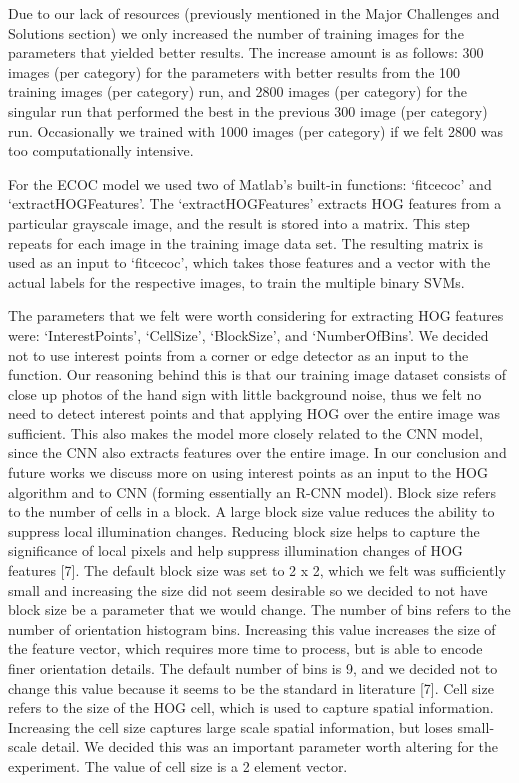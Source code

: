 \documentclass[conference]{IEEEtran}
\begin{document}
Due to our lack of resources (previously mentioned in the Major Challenges and Solutions section) we only increased the number of training images for the parameters that yielded better results. The increase amount is as follows: 300 images (per category) for the parameters with better results from the 100 training images (per category) run, and 2800 images (per category) for the singular run that performed the best in the previous 300 image (per category) run. Occasionally we trained with 1000 images (per category) if we felt 2800 was too computationally intensive.

For the ECOC model we used two of Matlab’s built-in functions: ‘fitcecoc’ and ‘extractHOGFeatures’. The ‘extractHOGFeatures’ extracts HOG features from a particular grayscale image, and the result is stored into a matrix. This step repeats for each image in the training image data set. The resulting matrix is used as an input to ‘fitcecoc’, which takes those features and a vector with the actual labels for the respective images, to train the multiple binary SVMs.

The parameters that we felt were worth considering for extracting HOG features were: ‘InterestPoints’, ‘CellSize’, ‘BlockSize’, and ‘NumberOfBins’. We decided not to use interest points from a corner or edge detector as an input to the function. Our reasoning behind this is that our training image dataset consists of close up photos of the hand sign with little background noise, thus we felt no need to detect interest points and that applying HOG over the entire image was sufficient. This also makes the model more closely related to the CNN model, since the CNN also extracts features over the entire image. In our conclusion and future works we discuss more on using interest points as an input to the HOG algorithm and to CNN (forming essentially an R-CNN model). Block size refers to the number of cells in a block. A large block size value reduces the ability to suppress local illumination changes. Reducing block size helps to capture the significance of local pixels and help suppress illumination changes of HOG features [7]. The default block size was set to 2 x 2, which we felt was sufficiently small and increasing the size did not seem desirable so we decided to not have block size be a parameter that we would change. The number of bins refers to the number of orientation histogram bins. Increasing this value increases the size of the feature vector, which requires more time to process, but is able to encode finer orientation details. The default number of bins is 9, and we decided not to change this value because it seems to be the standard in literature [7]. Cell size refers to the size of the HOG cell, which is used to capture spatial information. Increasing the cell size captures large scale spatial information, but loses small-scale detail. We decided this was an important parameter worth altering for the experiment. The value of cell size is a 2 element vector. 
\end{document}
